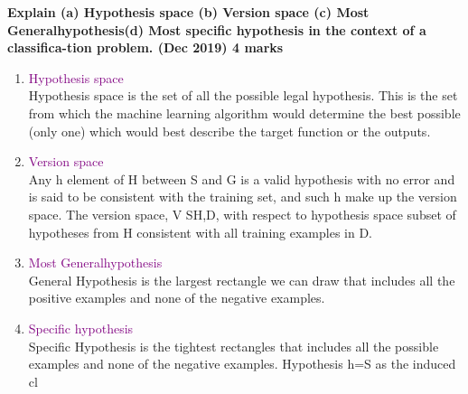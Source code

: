 \textbf{\textcolor{LightMagenta}{ Explain (a) Hypothesis space (b) Version space (c) Most Generalhypothesis(d) Most specific hypothesis in the context of a classifica-tion problem. (Dec 2019) \hfill 4 marks}} \\[5pt]
\begin{enumerate}
    \item 
    \textcolor{purple} {Hypothesis space} \\
    Hypothesis space is the set of all the possible legal hypothesis. This is the set from which the machine learning algorithm would determine the best possible (only one) which would best describe the target function or the outputs.\newline
    
    \item 
    \textcolor{purple} {Version space} \\ 
    Any h element of H between S and G is a valid hypothesis with no error and is said to be consistent with the training set, and such h make up the version space. The version space, V SH,D, with respect to hypothesis space subset of hypotheses from H consistent with all training examples in D.
    \newline
    
    \item
    \textcolor{purple} {Most Generalhypothesis} \\ 
    General Hypothesis is the largest rectangle we can draw that includes all the positive examples and none of the negative examples.
    
    \item
    \textcolor{purple} {Specific hypothesis} \\
    {Specific Hypothesis is the tightest rectangles that includes all the possible examples and none of the negative examples.\newline
    Hypothesis h=S as the induced cl }
\end{enumerate}
 
